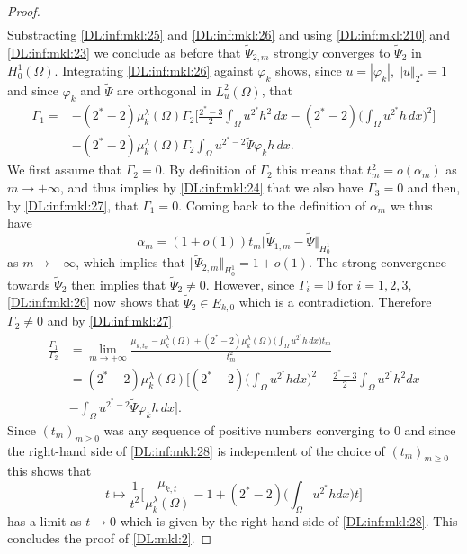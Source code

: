 \documentclass[10pt]{amsart}
\numberwithin{equation}{section}
\newcommand{\vp}{\varphi}
\newcommand{\Om}{\Omega}
\newcommand{\mkl}{\mu_{k}^{\lambda}}
\theoremstyle{plain}
\theoremstyle{remark}
\begin{document}
\begin{proof}
$$\begin{aligned}
\end{aligned} $$
Substracting \eqref{DL:inf:mkl:25} and \eqref{DL:inf:mkl:26} and using \eqref{DL:inf:mkl:210} and \eqref{DL:inf:mkl:23} we conclude as before that $\tilde{\Psi}_{2,m}$ strongly converges to $\tilde{\Psi}_2$ in $H^1_0(\Om)$. Integrating \eqref{DL:inf:mkl:26} against $\vp_k$ shows, since $u = |\vp_k|$, $\Vert u \Vert_{2^*} = 1$ and since $\vp_k$ and $\tilde{\Psi}$ are orthogonal in $L^2_u(\Om)$, that 
\begin{equation}  \label{DL:inf:mkl:27} 
\begin{aligned} 
\Gamma_1  = & - (2^*-2) \mkl(\Om) \Gamma_2\Bigg[   \frac{2^*-3}{2}  \int_{\Om} u^{2^*} h^2 \, dx - (2^*-2) \Big( \int_{\Om} u^{2^*}h \, dx\Big)^2 \Bigg]  \\
&- (2^*-2) \mkl(\Om) \Gamma_2 \int_{\Om} u^{2^*-2} \tilde{\Psi} \vp_k h \, dx . 
\end{aligned} 
\end{equation}
We first assume that $\Gamma_2 = 0$. By definition of $\Gamma_2$ this means that $t_m^2  = o(\alpha_m)$ as $m \to + \infty$, and thus implies by \eqref{DL:inf:mkl:24} that we also have $\Gamma_3 = 0$ and then, by \eqref{DL:inf:mkl:27}, that $\Gamma_1 = 0$. Coming back to the definition of $\alpha_m$ we thus have 
$$ \alpha_m = (1+o(1)) t_m \big \Vert \tilde{\Psi}_{1,m} - \tilde{\Psi} \big \Vert_{H^1_0}$$
as $m \to + \infty$, which implies that $\Vert \tilde{\Psi}_{2,m} \Vert_{H^1_0} = 1 + o(1)$. The strong convergence towards $\tilde{\Psi}_2$ then implies that $\tilde{\Psi}_2 \neq 0$. However, since $\Gamma_i = 0$ for $i=1,2,3$, \eqref{DL:inf:mkl:26} now shows that $\tilde{\Psi}_{2} \in E_{k,0}$ which is a contradiction. Therefore $\Gamma_2 \neq 0$ and by \eqref{DL:inf:mkl:27}
\begin{equation} \label{DL:inf:mkl:28}
 \begin{aligned}
\frac{\Gamma_1}{\Gamma_2}  & =  \lim_{m \to + \infty} \frac{\mu_{k,t_m} - \mkl(\Om) + (2^*-2) \mkl(\Om) \Big( \int_{\Om} u^{2^*}h \, dx\Big) t_m}{t_m^2}  \\
 & =  (2^*-2) \mkl(\Om)\Bigg[ (2^*-2) \Big( \int_{\Om} u^{2^*}h dx\Big)^2 - \frac{2^*-3}{2} \int_{\Om} u^{2^*} h^2 dx  \\
& - \int_{\Om} u^{2^*-2} \tilde{\Psi} \vp_k h \, dx\Bigg]  . 
\end{aligned} 
\end{equation}
Since $(t_m)_{m \ge 0}$ was any sequence of positive numbers converging to $0$ and since the right-hand side of \eqref{DL:inf:mkl:28} is independent of the choice of $(t_m)_{m \ge0}$ this shows that 
$$t \mapsto \frac{1}{t^2}\Bigg[ \frac{\mu_{k,t}}{\mkl(\Om)}  - 1 + (2^*-2) \Big(\int_{\Om} u^{2^*}hdx \Big) t \Bigg] $$
has a limit as $t \to 0$ which is given by the right-hand side of \eqref{DL:inf:mkl:28}. This concludes the proof of \eqref{DL:mkl:2}.
\end{proof}
\end{document}
